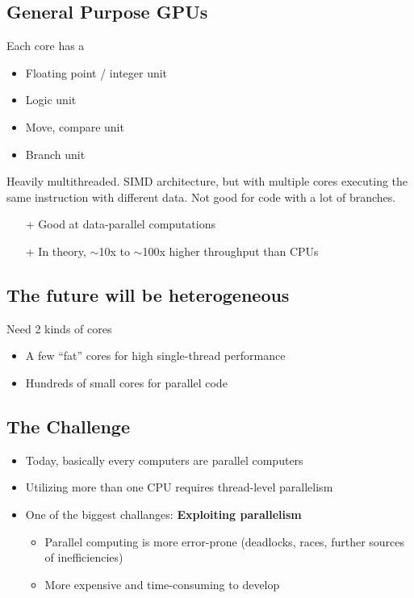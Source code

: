 \documentclass[a4paper]{article}
\begin{document}
\subsection{General Purpose GPUs}
Each core has a 
\begin{itemize}
  \item Floating point / integer unit
  \item Logic unit
  \item Move, compare unit
  \item Branch unit
\end{itemize}
Heavily multithreaded. SIMD architecture, but with multiple cores executing the
same instruction with different data. Not good for code with a lot of branches.
\begin{itemize}
  \item[+] Good at data-parallel computations
  \item[+] In theory, $\sim$10x to $\sim$100x higher throughput than CPUs
\end{itemize}

\subsection{The future will be heterogeneous}
Need 2 kinds of cores
\begin{itemize}
  \item A few ``fat'' cores for high single-thread performance
  \item Hundreds of small cores for parallel code
\end{itemize}


\subsection{The Challenge}
\begin{itemize}
  \item Today, basically every computers are parallel computers
  \item Utilizing more than one CPU requires thread-level parallelism
  \item One of the biggest challanges: \textbf{Exploiting parallelism}
    \begin{itemize}
      \item Parallel computing is more error-prone (deadlocks, races, further
        sources of inefficiencies)
      \item More expensive and time-consuming to develop
    \end{itemize}
\end{itemize}
\end{document}

